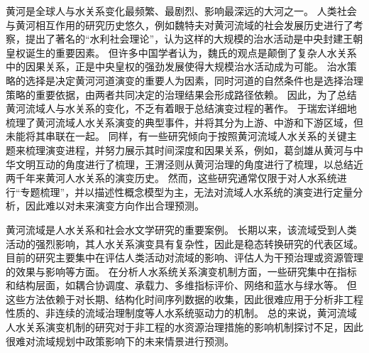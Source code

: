 
黄河是全球人与水关系变化最频繁、最剧烈、影响最深远的大河之一。
人类社会与黄河相互作用的研究历史悠久，例如魏特夫对黄河流域的社会发展历史进行了考察，提出了著名的“水利社会理论”，认为这样的大规模的治水活动是中央封建王朝皇权诞生的重要因素\cite{weitefu1989}。
但许多中国学者认为，魏氏的观点是颠倒了复杂人\textendash{}水关系中的因果关系，正是中央皇权的强劲发展使得大规模治水活动成为可能\cite{jizhaoding1981}。
治水策略的选择是决定黄河河道演变的重要人为因素，同时河道的自然条件也是选择治理策略的重要依据，由两者共同决定的治理结果会形成路径依赖\cite{WangWeiJing2009}。
因此，为了总结黄河流域人与水关系的变化，不乏有着眼于总结演变过程的著作。
于瑞宏详细地梳理了黄河流域人\textendash{}水关系演变的典型事件，并将其分为上游、中游和下游区域，但未能将其串联在一起\cite{yuruihong2011}。
同样，有一些研究倾向于按照黄河流域人\textendash{}水关系的关键主题来梳理演变进程，并努力展示其时间深度和因果关系，例如，葛剑雄从黄河与中华文明互动的角度进行了梳理\cite{gejianxiong2020}，王渭泾则从黄河治理的角度进行了梳理\cite{WangWeiJing2009}，以总结近两千年来黄河人\textendash{}水关系的演变历史。
然而，这些研究通常仅限于对人\textendash{}水系统进行“专题梳理”，并以描述性概念模型为主，无法对流域人\textendash{}水系统的演变进行定量分析，因此难以对未来演变方向作出合理预测。

黄河流域是人\textendash{}水关系和社会水文学研究的重要案例。
长期以来，该流域受到人类活动的强烈影响，其人\textendash{}水关系演变具有复杂性，因此是稳态转换研究的代表区域\cite{zuo2022, wang2014}。
目前的研究主要集中在评估人类活动对流域的影响、评估人为干预治理或资源管理的效果与影响等方面\cite{wang2016a, WuXuTong2021}。
在分析人\textendash{}水系统关系演变机制方面，一些研究集中在指标和结构层面，如耦合协调度\cite{libo2022}、承载力\cite{wang2022d}、多维指标评价\cite{li2020}、网络\cite{song2022}和蓝水与绿水等\cite{zhuo2016a}。
但这些方法依赖于对长期、结构化时间序列数据的收集，因此很难应用于分析非工程性质的、非连续的流域治理制度等人\textendash{}水系统驱动力的机制。
总的来说，黄河流域人\textendash{}水关系演变机制的研究对于非工程的水资源治理措施的影响机制探讨不足，因此很难对流域规划中政策影响下的未来情景进行预测。

